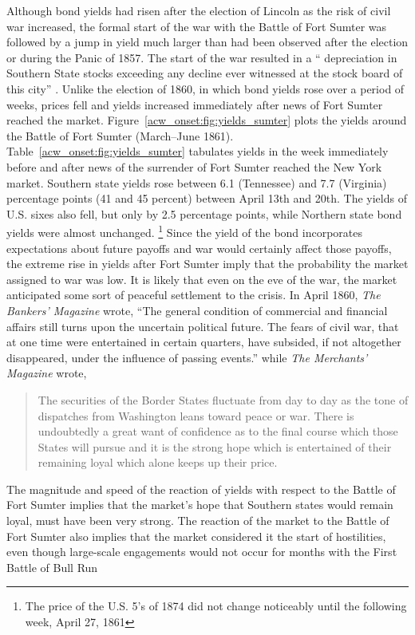 Although bond yields had risen after the election of Lincoln as the risk of civil war increased, the formal start of the war with the Battle of Fort Sumter was followed by a jump in yield much larger than had been observed after the election or during the Panic of 1857.
The start of the war resulted in a `` depreciation in Southern State stocks exceeding any decline ever witnessed at the stock board of this city'' \parencite[919]{BankersMagazine1860}.
Unlike the election of 1860, in which bond yields rose over a period of weeks, prices fell and yields increased immediately after news of Fort Sumter reached the market.
Figure~\ref{acw_onset:fig:yields_sumter} plots the yields around the Battle of Fort Sumter (March--June 1861).
Table~\ref{acw_onset:fig:yields_sumter} tabulates yields in the week immediately before and after news of the surrender of Fort Sumter reached the New York market.
Southern state yields rose between 6.1 (Tennessee) and 7.7 (Virginia) percentage points (41 and 45 percent) between April 13th and 20th.
The yields of U.S. sixes also fell, but only by 2.5 percentage points,
while Northern state bond yields were almost unchanged.%
\footnote{The price of the U.S. 5's of 1874 did not change noticeably until the following week, April 27, 1861}
Since the yield of the bond incorporates expectations about future payoffs and war would certainly affect those payoffs, the extreme rise in yields after Fort Sumter imply that the probability the market assigned to war was low.
It is likely that even on the eve of the war, the market anticipated some sort of peaceful settlement to the crisis.
In April 1860, \textit{The Bankers' Magazine} wrote, ``The general condition of commercial and financial affairs still turns upon the uncertain political future. The fears of civil war, that at one time were entertained in certain quarters, have subsided, if not altogether disappeared, under the influence of passing events.'' \parencite[413]{HomansDana1861a}
while \textit{The Merchants' Magazine} wrote,
\begin{quotation}
  The securities of the Border States fluctuate from day to day as the tone of dispatches from Washington leans toward peace or war.
  There is undoubtedly a great want of confidence as to the final course which those States will pursue and it is the strong hope which is entertained of their remaining loyal which alone keeps up their price. \parencite[838]{BankersMagazine1860}
\end{quotation}
The magnitude and speed of the reaction of yields with respect to the Battle of Fort Sumter implies that the market's hope that Southern states would remain loyal, must have been very strong.
The reaction of the market to the Battle of Fort Sumter also implies that the market considered it the start of hostilities, even though large-scale engagements would not occur for months with the First Battle of Bull Run

